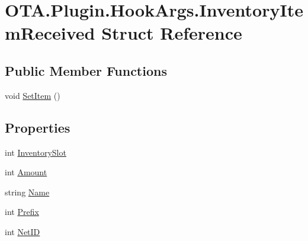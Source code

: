 \hypertarget{struct_o_t_a_1_1_plugin_1_1_hook_args_1_1_inventory_item_received}{}\section{O\+T\+A.\+Plugin.\+Hook\+Args.\+Inventory\+Item\+Received Struct Reference}
\label{struct_o_t_a_1_1_plugin_1_1_hook_args_1_1_inventory_item_received}
\subsection*{Public Member Functions}
\begin{DoxyCompactItemize}
\item 
void \hyperlink{struct_o_t_a_1_1_plugin_1_1_hook_args_1_1_inventory_item_received_a121ce9ea7044f37daca28de0b7d56590}{Set\+Item} ()
\end{DoxyCompactItemize}
\subsection*{Properties}
\begin{DoxyCompactItemize}
\item 
int \hyperlink{struct_o_t_a_1_1_plugin_1_1_hook_args_1_1_inventory_item_received_aa52efd9a64708421ff860fc0d285d4d1}{Inventory\+Slot}
\item 
int \hyperlink{struct_o_t_a_1_1_plugin_1_1_hook_args_1_1_inventory_item_received_abff90a96c4cb932b0bf34349977c041b}{Amount}
\item 
string \hyperlink{struct_o_t_a_1_1_plugin_1_1_hook_args_1_1_inventory_item_received_a2641598699f861e3fd8a3c58ab006dae}{Name}
\item 
int \hyperlink{struct_o_t_a_1_1_plugin_1_1_hook_args_1_1_inventory_item_received_ae266da8aa94f51a410ef91fa0dd8a5b8}{Prefix}
\item 
int \hyperlink{struct_o_t_a_1_1_plugin_1_1_hook_args_1_1_inventory_item_received_ab19e452b31df36206959b64090f11192}{Net\+I\+D}
\end{DoxyCompactItemize}


